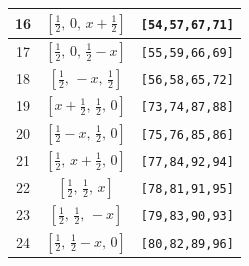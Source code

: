 \documentclass[fleqn,8pt]{jsarticle}
\begin{document}
\begin{longtable}{ccc}
16 & $\left[ \frac{1}{2},\, 0,\, x + \frac{1}{2} \right]$ & {\tt [54,57,67,71]} \\ \hline
17 & $\left[ \frac{1}{2},\, 0,\, \frac{1}{2} - x \right]$ & {\tt [55,59,66,69]} \\ \hline
18 & $\left[ \frac{1}{2},\, - x,\, \frac{1}{2} \right]$ & {\tt [56,58,65,72]} \\ \hline
19 & $\left[ x + \frac{1}{2},\, \frac{1}{2},\, 0 \right]$ & {\tt [73,74,87,88]} \\ \hline
20 & $\left[ \frac{1}{2} - x,\, \frac{1}{2},\, 0 \right]$ & {\tt [75,76,85,86]} \\ \hline
21 & $\left[ \frac{1}{2},\, x + \frac{1}{2},\, 0 \right]$ & {\tt [77,84,92,94]} \\ \hline
22 & $\left[ \frac{1}{2},\, \frac{1}{2},\, x \right]$ & {\tt [78,81,91,95]} \\ \hline
23 & $\left[ \frac{1}{2},\, \frac{1}{2},\, - x \right]$ & {\tt [79,83,90,93]} \\ \hline
24 & $\left[ \frac{1}{2},\, \frac{1}{2} - x,\, 0 \right]$ & {\tt [80,82,89,96]} \\
\end{longtable}
\renewcommand{\arraystretch}{1.2}
\end{document}
